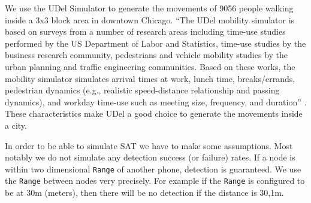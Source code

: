 \documentclass[10pt,titlepage]{article}
\begin{document}
We use the UDel Simulator \cite{UDEL} to generate the movements of 9056 people walking inside a 3x3 block area in downtown Chicago. ``The UDel mobility simulator is based on surveys from a number of research areas including time-use studies performed by the US Department of Labor and Statistics, time-use studies by the business research community, pedestrians and vehicle mobility studies by the urban planning and traffic engineering communities. Based on these works, the mobility simulator simulates arrival times at work, lunch time, breaks/errands, pedestrian dynamics (e.g., realistic speed-distance relationship and passing dynamics), and workday time-use such as meeting size, frequency, and duration'' \cite{UDEL}. These characteristics make UDel a good choice to generate the movements inside a city.\\

In order to be able to simulate SAT we have to make some assumptions. Most notably we do not simulate any detection success (or failure) rates. If a node is within two dimensional \texttt{Range} of another phone, detection is guaranteed. We use the \texttt{Range} between nodes very precisely. For example if the \texttt{Range} is configured to be at 30m (meters), then there will be no detection if the distance is 30,1m.\\
\end{document}
